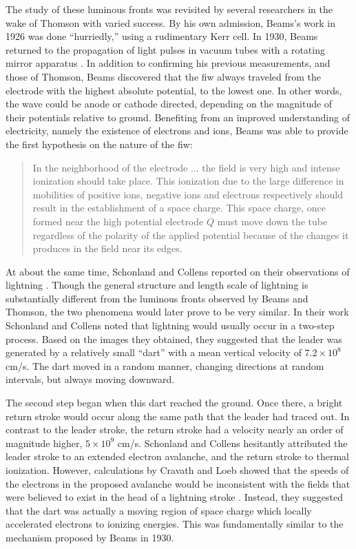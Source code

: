 The study of these luminous fronts was revisited by several researchers in the
wake of Thomson \cite{James1904, Whiddington1925, Beams1926} with varied
success. By his own admission, Beams's work in 1926 was done ``hurriedly,''
using a rudimentary Kerr cell. In 1930, Beams returned to the propagation of
light pulses in vacuum tubes with a rotating mirror apparatus \cite{Beams1930}.
In addition to confirming his previous measurements, and those of Thomson, Beams
discovered that the \acs{fiw} always traveled from the electrode with the
highest absolute potential, to the lowest one. In other words, the wave could be
anode or cathode directed, depending on the magnitude of their potentials
relative to ground. Benefiting from an improved understanding of electricity,
namely the existence of electrons and ions, Beams was able to provide the first
hypothesis on the nature of the \acs{fiw}:
\begin{quote}
  In the neighborhood of the electrode $\ldots{}$ the field is very high and
  intense ionization should take place. This ionization due to the large
  difference in mobilities of positive ions, negative ions and electrons
  respectively should result in the establishment of a space charge. This space
  charge, once formed near the high potential electrode $Q$ must move down the
  tube regardless of the polarity of the applied potential because of the
  changes it produces in the field near its edges.
\end{quote}

At about the same time, Schonland and Collens reported on their observations of
lightning \cite{Schonland1933}. Though the general structure and length scale of
lightning is substantially different from the luminous fronts observed by Beams
and Thomson, the two phenomena would later prove to be very similar. In their
work Schonland and Collens noted that lightning would usually occur in a
two-step process. Based on the images they obtained, they suggested that
the leader was generated by a relatively small ``dart'' with a mean vertical
velocity of $7.2\times10^8$ cm/s. The dart moved in a random manner, changing
directions at random intervals, but always moving downward.

The second step began when this dart reached the ground. Once there, a bright
return stroke would occur along the same path that the leader had traced out. In
contrast to the leader stroke, the return stroke had a velocity nearly an order
of magnitude higher, $5\times10^9$ cm/s. Schonland and Collens hesitantly
attributed the leader stroke to an extended electron avalanche, and the return
stroke to thermal ionization. However, calculations by Cravath and Loeb showed
that the speeds of the electrons in the proposed avalanche would be inconsistent
with the fields that were believed to exist in the head of a lightning stroke
\cite{Cravath1935}. Instead, they suggested that the dart was actually a moving
region of space charge which locally accelerated electrons to ionizing energies.
This was fundamentally similar to the mechanism proposed by Beams in 1930.

